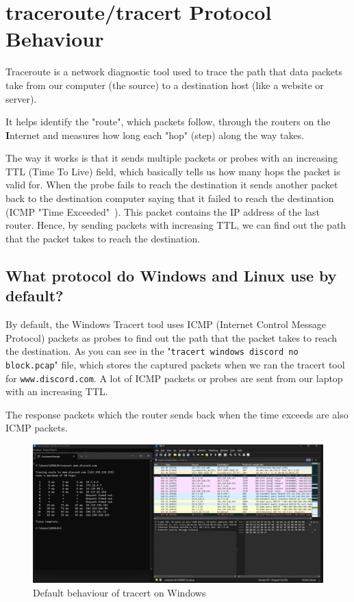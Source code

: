\documentclass{article}
\begin{document}
\section{traceroute/tracert Protocol Behaviour}

Traceroute is a network diagnostic tool used to trace the path that data packets take from our computer (the source) to a destination host (like a website or server).

It helps identify the "route", which packets follow, through the routers on the \textbf{I}nternet and measures how long each "hop" (step) along the way takes.

The way it works is that it sends multiple packets or probes with an increasing TTL (Time To Live) field, which basically tells us how many hops the packet is valid for. When the probe fails to reach the destination it sends another packet back to the destination computer saying that it failed to reach the destination (ICMP "Time Exceeded"~\cite{ServerFault_2011_traceroute}). This packet contains the IP address of the last router. Hence, by sending packets with increasing TTL, we can find out the path that the packet takes to reach the destination. 

\subsection{What protocol do Windows and Linux use by default?}

By default, the Windows Tracert tool uses ICMP (Internet Control Message Protocol) packets as probes to find out the path that the packet takes to reach the destination. As you can see in the "\texttt{tracert windows discord no block.pcap}" file, which stores the captured packets when we ran the tracert tool for \texttt{www.discord.com}. A lot of ICMP packets or probes are sent from our laptop with an increasing TTL.

The response packets which the router sends back when the time exceeds are also ICMP packets.

\begin{figure}[H]
    \centering
    \includegraphics[width=1\linewidth]{tracert windows discord no block.png}
    \caption{Default behaviour of tracert on Windows}
    \label{fig:placeholder}
\end{figure}
\end{document}
